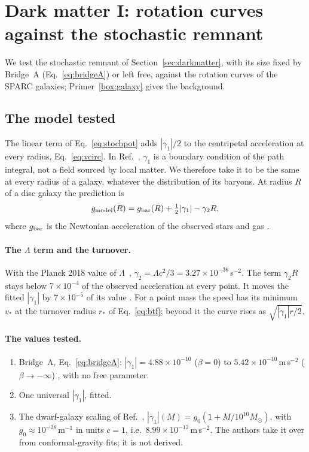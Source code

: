 \section{Dark matter I: rotation curves against the stochastic remnant}\label{sec:sparc}

We test the stochastic remnant of Section~\ref{sec:darkmatter}, with its size fixed by Bridge~A (Eq.~\eqref{eq:bridgeA}) or left free,
against the rotation curves of the SPARC galaxies; Primer~\ref{box:galaxy} gives the background.



\subsection{The model tested}\label{sec:sparc-model}

The linear term of Eq.~\eqref{eq:stochpot} adds $|\gamma_1|/2$ to the centripetal acceleration at every radius, Eq.~\eqref{eq:vcirc}.
In Ref.~\cite{oppenheimrusso}, $\gamma_1$ is a boundary condition of the path integral, not a field sourced by local matter. We therefore
take it to be the same at every radius of a galaxy, whatever the distribution of its baryons. At radius $R$ of a disc galaxy the
prediction is
\begin{equation}\label{eq:sparc-model}
g_{\rm model}(R)=g_{\rm bar}(R)+\tfrac12|\gamma_1|-\gamma_2 R ,
\end{equation}
where $g_{\rm bar}$ is the Newtonian acceleration of the observed stars and gas \tagH.

\paragraph{The $\Lambda$ term and the turnover.} With the Planck 2018 value of $\Lambda$~\cite{planck18}, $\gamma_2=\Lambda c^2/3=
3.27\times10^{-36}$\,s$^{-2}$. The term $\gamma_2R$ stays below $7\times10^{-4}$ of the observed acceleration at every point. It moves
the fitted $|\gamma_1|$ by $7\times10^{-5}$ of its value . For a point mass the speed has its minimum $v_*$ at the turnover
radius $r_*$ of Eq.~\eqref{eq:btf}; beyond it the curve rises as $\sqrt{|\gamma_1|r/2}$.

\paragraph{The values tested.}
\begin{enumerate}[nosep,label=(\roman*)]
\item Bridge~A, Eq.~\eqref{eq:bridgeA}: $|\gamma_1|=4.88\times10^{-10}$ ($\beta=0$) to $5.42\times10^{-10}$\,m\,s$^{-2}$
($\beta\to-\infty$) , with no free parameter.
\item One universal $|\gamma_1|$, fitted.
\item The dwarf-galaxy scaling of Ref.~\cite{oppenheimrusso}, $|\gamma_1|(M)=g_0(1+M/10^{10}M_\odot)$, with $g_0\approx10^{-28}$\,m$^{-1}$
in units $c=1$, i.e.\ $8.99\times10^{-12}$\,m\,s$^{-2}$. The authors take it over from conformal-gravity fits; it is not derived.
\end{enumerate}

